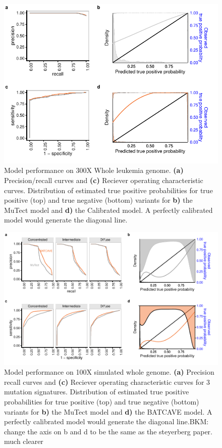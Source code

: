 \documentclass[a4,center,fleqn]{NAR}
\newcommand{\bkmcomment}[1]{{\color{blue}BKM: #1}}
\newcommand{\batcave}{BATCAVE }
\begin{document}
\begin{figure}[t]
  \begin{center}
  \includegraphics{figures/aml_plot.pdf}
  \end{center}
  \caption{Model performance on 300X Whole leukemia genome.
  \textbf{(a)} Precision/recall curves and \textbf{(c)} Reciever operating characteristic curves.
  Distribution of estimated true positive probabilities for true positive (top) and true negative (bottom) variants for \textbf{b)} the MuTect model and \textbf{d)} the Calibrated model.
  A perfectly calibrated model would generate the diagonal line.}
  \label{NAR-aml}
\end{figure}

\begin{figure}
  \begin{center}
  \includegraphics{figures/fig_wes.pdf}
  \end{center}
  \caption{Model performance on 100X simulated whole genome.
  \textbf{(a)} Precision recall curves and \textbf{(c)} Reciever operating characteristic curves for 3 mutation signatures.
  Distribution of estimated true positive probabilities for true positive (top) and true negative (bottom) variants for \textbf{b)} the MuTect model and \textbf{d)} the \batcave model.
  A perfectly calibrated model would generate the diagonal line.\bkmcomment{change the axis on b and d to be the same as the steyerberg paper. much clearer}}
\label{NAR-wgs_fig}
\end{figure}
\end{document}

